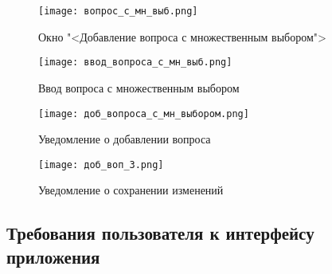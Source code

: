 \begin{figure}[H]
	\centering
	\texttt{[image: вопрос\_с\_мн\_выб.png]}
	\caption{Окно "<Добавление вопроса с множественным выбором">}
	\label{question_2:image}
\end{figure}
\begin{figure}[H]
	\centering
	\texttt{[image: ввод\_вопроса\_с\_мн\_выб.png]}
	\caption{Ввод вопроса с множественным выбором}
	\label{question_input:image}
\end{figure}
\begin{figure}[H]
	\centering
	\texttt{[image: доб\_вопроса\_с\_мн\_выбором.png]}
	\caption{Уведомление о добавлении вопроса}
	\label{question_3t:image}
\end{figure}
\begin{figure}[H]
	\centering
	\texttt{[image: доб\_воп\_3.png]}
	\caption{Уведомление о сохранении изменений}
	\label{question_4t:image}
\end{figure}

\subsection{Требования пользователя к интерфейсу приложения}

